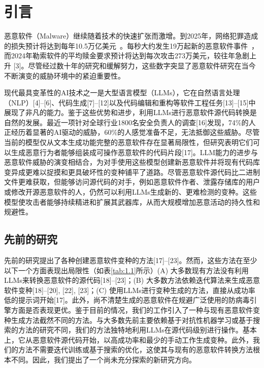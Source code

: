 
\chapter{引言}
恶意软件（Malware）继续随着技术的快速扩张而激增。到2025年，网络犯罪造成的损失预计将达到每年10.5万亿美元~\cite{PIA2024}。每秒大约发生19万起新的恶意软件事件~\cite{AVG2024}，而2024年勒索软件的平均赎金要求预计将达到每次攻击273万美元，较往年急剧上升 [3]。尽管经过数十年的研究和缓解努力，这些数字突显了恶意软件研究在当今不断演变的威胁环境中的紧迫重要性。

现代最具变革性的AI技术之一是大型语言模型（LLMs），它在自然语言处理（NLP）[4]–[6]、代码生成[7]–[12]以及代码编辑和重构等软件工程任务[13]–[15]中展现了非凡的能力。鉴于这些优势和进步，利用LLMs进行恶意软件源代码转换是自然的发展。最近一项针对全球行业1800名安全负责人的调查[16]发现，74\%的人正经历着显著的AI驱动的威胁，60\%的人感觉准备不足，无法抵御这些威胁。尽管当前的模型仅从文本生成功能完整的恶意软件存在显著局限性，但研究表明它们可以生成恶意行为者能够组装成可操作恶意软件的代码片段[17]。LLM能力的进步与恶意软件威胁的演变相结合，为对手使用这些模型创建新恶意软件并将现有代码库变异成更难以捉摸和更具破坏性的变种铺平了道路。尽管恶意软件源代码比二进制文件更难获取，但能够访问源代码的对手，例如恶意软件作者、泄露存储库的用户或修改开源恶意软件的人，仍然可以利用LLMs生成新的、更难检测的变种。这些模型使攻击者能够持续精进和扩展其武器库，从而大规模增加恶意活动的持久性和规避性。

\section{先前的研究}
先前的研究提出了各种创建恶意软件变种的方法[17]–[23]。然而，这些方法在至少以下一个方面表现出局限性（如表\ref{tab:1.1}所示）(A) 大多数现有方法没有利用LLMs来转换恶意软件的源代码[18]–[23]；(B) 大多数方法依赖迭代算法来生成恶意软件变种[18]–[20], [22], [23]；(C) 使用LLMs进行变种生成的方法，直接从成功率低的提示词开始[17]。此外，尚不清楚生成的恶意软件在规避广泛使用的防病毒引擎方面是否表现更优。鉴于目前的情况，我们的工作引入了一种与现有恶意软件变种生成方法截然不同的方法。与大多数先前主要依赖基于对抗性机器学习或基于搜索的方法的研究不同，我们的方法独特地利用LLMs在源代码级别进行操作。基本上，它从恶意软件源代码开始，以高成功率和最少的手动工作生成变种。此外，我们的方法不需要迭代训练或基于搜索的优化，这使其与现有的恶意软件转换方法根本不同。因此，我们提出了一个尚未充分探索的新研究方向。

